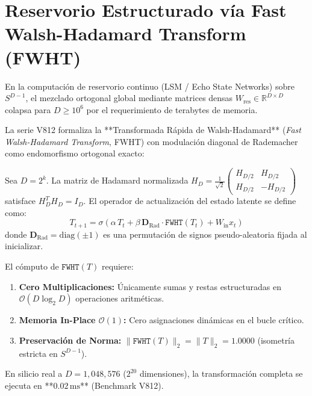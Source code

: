 \section{Reservorio Estructurado vía Fast Walsh-Hadamard Transform (FWHT)}
\label{sec:fwht_reservoir}

En la computación de reservorio continuo (LSM / Echo State Networks) sobre $S^{D-1}$, el mezclado ortogonal global mediante matrices densas $W_{\text{res}} \in \mathbb{R}^{D \times D}$ colapsa para $D \ge 10^6$ por el requerimiento de terabytes de memoria. 

La serie V812 formaliza la **Transformada Rápida de Walsh-Hadamard** (\emph{Fast Walsh-Hadamard Transform}, FWHT) con modulación diagonal de Rademacher como endomorfismo ortogonal exacto:

\begin{definition}
Sea $D = 2^k$. La matriz de Hadamard normalizada $H_D = \frac{1}{\sqrt{2}} \begin{pmatrix} H_{D/2} & H_{D/2} \\ H_{D/2} & -H_{D/2} \end{pmatrix}$ satisface $H_D^T H_D = I_D$. El operador de actualización del estado latente se define como:
\begin{equation}
T_{t+1} = \sigma\left( \alpha \, T_t + \beta \, \mathbf{D}_{\text{Rad}} \cdot \texttt{FWHT}(T_t) + W_{\text{in}} x_t \right)
\end{equation}
donde $\mathbf{D}_{\text{Rad}} = \text{diag}(\pm 1)$ es una permutación de signos pseudo-aleatoria fijada al inicializar.
\end{definition}

\begin{theorem}
\label{thm:fwht_complexity}
El cómputo de $\texttt{FWHT}(T)$ requiere:
\begin{enumerate}
    \item \textbf{Cero Multiplicaciones:} Únicamente sumas y restas estructuradas en $\mathcal{O}(D \log_2 D)$ operaciones aritméticas.
    \item \textbf{Memoria In-Place $\mathcal{O}(1)$:} Cero asignaciones dinámicas en el bucle crítico.
    \item \textbf{Preservación de Norma:} $\| \texttt{FWHT}(T) \|_2 = \| T \|_2 = 1.0000$ (isometría estricta en $S^{D-1}$).
\end{enumerate}
En silicio real a $D = 1{,}048{,}576$ ($2^{20}$ dimensiones), la transformación completa se ejecuta en **$0.02\,\text{ms}$** (Benchmark V812).
\end{theorem}

